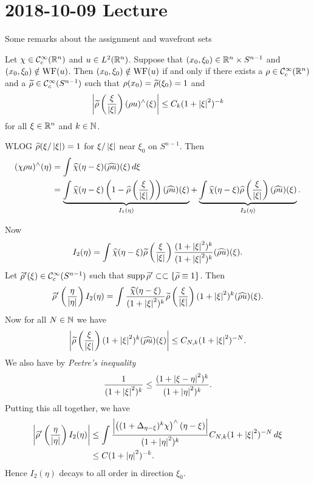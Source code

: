 \section{2018-10-09 Lecture}

Some remarks about the assignment and wavefront sets

Let $\chi\in\mathcal{C}_c^\infty(\mathbb{R}^n)$ and $u\in L^2(\mathbb{R}^n)$.
Suppose that $(x_0,\xi_0)\in\mathbb{R}^n\times S^{n-1}$ and $(x_0,\xi_0)\notin\operatorname{WF}(u)$.
Then $(x_0,\xi_0)\notin\operatorname{WF}(u)$ if and only if there exists a $\rho\in\mathcal{C}_c^\infty(\mathbb{R}^n)$ and a $\widetilde\rho\in\mathcal{C}_c^\infty(S^{n-1})$ such that $\rho(x_0)=\widetilde\rho(\xi_0)=1$ and
\[ \left\lvert \widetilde\rho\left( \frac\xi{\left\lvert \xi \right\rvert} \right) (\rho u)^\wedge(\xi)  \right\rvert \leq C_k(1+\left\lvert \xi \right\rvert^2)^{-k} \]
for all $\xi\in\mathbb{R}^n$ and $k\in\mathbb{N}$.

WLOG $\widehat\rho(\xi/\left\lvert \xi \right\rvert)=1$ for $\xi/\left\lvert \xi \right\rvert$ near $\xi_0$ on $S^{n-1}$.
Then
\begin{align*}
  (\chi\rho u)^\wedge(\eta) &= \int \widehat\chi(\eta-\xi) (\widehat{\rho u})(\xi) \, d\xi \\
  &= \underbrace{\int \widehat\chi(\eta-\xi) \left( 1-\widehat\rho\left( \frac\xi{\left\lvert \xi \right\rvert} \right) \right) (\widehat{\rho u})(\xi)}_{I_1(\eta)} + \underbrace{\int \widehat\chi(\eta-\xi) \widehat\rho\left( \frac\xi{\left\lvert \xi \right\rvert} \right) (\widehat{\rho u})(\xi)}_{I_2(\eta)}.
\end{align*}

Now
\begin{equation*}
  I_2(\eta) = \int \widehat\chi(\eta-\xi) \widetilde\rho\left( \frac\xi{\left\lvert \xi \right\rvert} \right) \frac{(1+\left\lvert \xi \right\rvert^2)^k}{(1+\left\lvert \xi \right\rvert^2)^k} (\widehat{\rho u})(\xi).
\end{equation*}
Let $\widetilde\rho'(\xi)\in\mathcal{C}_c^\infty(S^{n-1})$ such that $\operatorname{supp}\widetilde\rho'\subset\subset\left\{ \widetilde\rho\equiv1 \right\}$.
Then
\begin{equation*}
  \widehat\rho'\left( \frac{\eta}{\left\lvert \eta \right\rvert} \right) I_2(\eta) = \int \frac{\widehat\chi(\eta-\xi)}{(1+\left\lvert \xi \right\rvert^2)^k} \widetilde\rho\left( \frac\xi{\left\lvert \xi \right\rvert} \right) (1+\left\lvert \xi \right\rvert^2)^k (\widehat{\rho u})(\xi).
\end{equation*}
Now for all $N\in\mathbb{N}$ we have
\begin{equation*}
  \left\lvert \widetilde\rho\left( \frac\xi{\left\lvert \xi \right\rvert} \right) (1+\left\lvert \xi \right\rvert^2)^k (\widehat{\rho u})(\xi) \right\rvert \leq C_{N,k}(1+\left\lvert \xi \right\rvert^2)^{-N}.
\end{equation*}
We also have by \emph{Peetre's inequality}
\begin{equation*}
  \frac1{(1+\left\lvert \xi \right\rvert^2)^k} \leq \frac{(1+\left\lvert \xi-\eta \right\rvert^2)^k}{(1+\left\lvert \eta \right\rvert^2)^k}.
\end{equation*}
Putting this all together, we have
\begin{align*}
  \left\lvert  \widehat\rho'\left( \frac{\eta}{\left\lvert \eta \right\rvert} \right) I_2(\eta)  \right\rvert &\leq \int \frac{\left\lvert \left( (1+\Delta_{\eta-\xi})^k\chi \right)^\wedge(\eta-\xi) \right\rvert}{(1+\left\lvert \eta \right\rvert^2)^k} C_{N,k} (1+\left\lvert \xi \right\rvert^2)^{-N} \, d\xi \\
  &\leq C(1+\left\lvert \eta \right\rvert^2)^{-k}.
\end{align*}
Hence $I_2(\eta)$ decays to all order in direction $\xi_0$.

